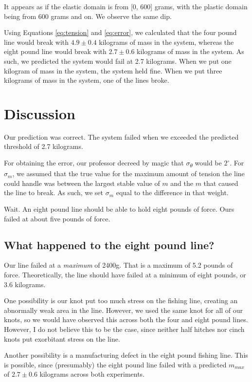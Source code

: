 \documentclass[12pt]{article}
\begin{document}
It appears as if the elastic domain is from [0, 600] grams, with the plastic domain being from 600 grams and on. We observe the same dip.

Using Equations \ref{eq:tension} and \ref{eq:error}, we calculated that the four pound line would break with \(4.9\pm0.4\) kilograms of mass in the system, whereas the eight pound line would break with \(2.7\pm0.6\) kilograms of mass in the system. As such, we predicted the system would fail at 2.7 kilograms. When we put one kilogram of mass in the system, the system held fine. When we put three kilograms of mass in the system, one of the lines broke.
\section{Discussion}
\label{sec:orgce62dd9}

Our prediction was correct. The system failed when we exceeded the predicted threshold of 2.7 kilograms.

For obtaining the error, our professor decreed by magic that \(\sigma\)\textsubscript{\(\theta\)} would be \(2^{\circ}\). For \(\sigma_m\), we assumed that the true value for the maximum amount of tension the line could handle was between the largest stable value of \(m\) and the \(m\) that caused the line to break. As such, we set \(\sigma_m\) equal to the difference in that weight.

Wait. An eight pound line should be able to hold eight pounds of force. Ours failed at about five pounds of force.
\subsection{What happened to the eight pound line?}
\label{sec:org8785656}

Our line failed at a \emph{maximum} of 2400g. That is a maximum of 5.2 pounds of force. Theoretically, the line should have failed at a minimum of eight pounds, or 3.6 kilograms.

One possibility is our knot put too much stress on the fishing line, creating an abnormally weak area in the line. However, we used the same knot for all of our knots, so we would have observed this across both the four and eight pound lines. However, I do not believe this to be the case, since neither half hitches nor cinch knots put exorbitant stress on the line.

Another possibility is a manufacturing defect in the eight pound fishing line. This is possible, since (presumably) the eight pound line failed with a predicted \(m_{max}\) of \(2.7\pm0.6\) kilograms across both experiments.
\end{document}
